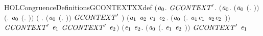 \begin{SaveVerbatim}{HOLCongruenceDefinitionsGCONTEXTXXdef}
\HOLTokenTurnstile{}  \HOLSymConst{\ensuremath{=}}
   \ensuremath{(}\HOLTokenLambda{}\ensuremath{\HOLBoundVar{a}\sb{\mathrm{0}}}.
        \HOLSymConst{\HOLTokenForall{}}\ensuremath{\HOLBoundVar{GCONTEXT}\sp{\prime}}.
            \ensuremath{(}\HOLSymConst{\HOLTokenForall{}}\ensuremath{\HOLBoundVar{a}\sb{\mathrm{0}}}.
                 \ensuremath{(}\ensuremath{\HOLBoundVar{a}\sb{\mathrm{0}}} \HOLSymConst{\ensuremath{=}} \ensuremath{(}\HOLTokenLambda{}. \ensuremath{)}\ensuremath{)} \HOLSymConst{\HOLTokenDisj{}} \ensuremath{(}\HOLSymConst{\HOLTokenExists{}}. \ensuremath{\HOLBoundVar{a}\sb{\mathrm{0}}} \HOLSymConst{\ensuremath{=}} \ensuremath{(}\HOLTokenLambda{}. \ensuremath{)}\ensuremath{)} \HOLSymConst{\HOLTokenDisj{}}
                 \ensuremath{(}\HOLSymConst{\HOLTokenExists{}} . \ensuremath{(}\ensuremath{\HOLBoundVar{a}\sb{\mathrm{0}}} \HOLSymConst{\ensuremath{=}} \ensuremath{(}\HOLTokenLambda{}. \HOLSymConst{\ensuremath{\ldotp}} \ensuremath{)}\ensuremath{)} \HOLSymConst{\HOLTokenConj{}} \ensuremath{\HOLBoundVar{GCONTEXT}\sp{\prime}} \ensuremath{)} \HOLSymConst{\HOLTokenDisj{}}
                 \ensuremath{(}\HOLSymConst{\HOLTokenExists{}}\ensuremath{\HOLBoundVar{a}\sb{\mathrm{1}}} \ensuremath{\HOLBoundVar{a}\sb{\mathrm{2}}} \ensuremath{\HOLBoundVar{e}\sb{\mathrm{1}}} \ensuremath{\HOLBoundVar{e}\sb{\mathrm{2}}}.
                      \ensuremath{(}\ensuremath{\HOLBoundVar{a}\sb{\mathrm{0}}} \HOLSymConst{\ensuremath{=}} \ensuremath{(}\HOLTokenLambda{}. \ensuremath{\HOLBoundVar{a}\sb{\mathrm{1}}}\HOLSymConst{\ensuremath{\ldotp}}\ensuremath{\HOLBoundVar{e}\sb{\mathrm{1}}}  \HOLSymConst{\ensuremath{+}} \ensuremath{\HOLBoundVar{a}\sb{\mathrm{2}}}\HOLSymConst{\ensuremath{\ldotp}}\ensuremath{\HOLBoundVar{e}\sb{\mathrm{2}}} \ensuremath{)}\ensuremath{)} \HOLSymConst{\HOLTokenConj{}}
                      \ensuremath{\HOLBoundVar{GCONTEXT}\sp{\prime}} \ensuremath{\HOLBoundVar{e}\sb{\mathrm{1}}} \HOLSymConst{\HOLTokenConj{}} \ensuremath{\HOLBoundVar{GCONTEXT}\sp{\prime}} \ensuremath{\HOLBoundVar{e}\sb{\mathrm{2}}}\ensuremath{)} \HOLSymConst{\HOLTokenDisj{}}
                 \ensuremath{(}\HOLSymConst{\HOLTokenExists{}}\ensuremath{\HOLBoundVar{e}\sb{\mathrm{1}}} \ensuremath{\HOLBoundVar{e}\sb{\mathrm{2}}}.
                      \ensuremath{(}\ensuremath{\HOLBoundVar{a}\sb{\mathrm{0}}} \HOLSymConst{\ensuremath{=}} \ensuremath{(}\HOLTokenLambda{}. \ensuremath{\HOLBoundVar{e}\sb{\mathrm{1}}}  \HOLSymConst{\ensuremath{\mid}} \ensuremath{\HOLBoundVar{e}\sb{\mathrm{2}}} \ensuremath{)}\ensuremath{)} \HOLSymConst{\HOLTokenConj{}} \ensuremath{\HOLBoundVar{GCONTEXT}\sp{\prime}} \ensuremath{\HOLBoundVar{e}\sb{\mathrm{1}}} \HOLSymConst{\HOLTokenConj{}}

\end{SaveVerbatim}
